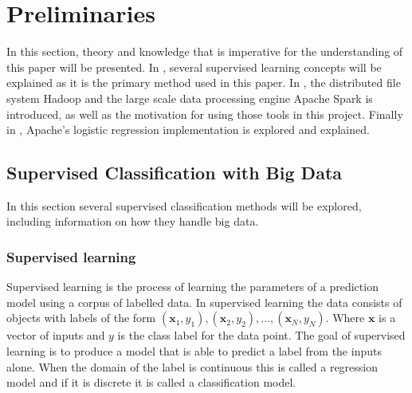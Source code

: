 \section{Preliminaries}\label{sec:prelim}
In this section, theory and knowledge that is imperative for the understanding of this paper will be presented. In , several supervised learning concepts will be explained as it is the primary method used in this paper. In , the distributed file system Hadoop and the large scale data processing engine Apache Spark is introduced, as well as the motivation for using those tools in this project. Finally in , Apache's logistic regression implementation is explored and explained. 

\subsection{Supervised Classification with Big Data}\label{sec:supervisedclassification}
In this section several supervised classification methods will be explored, including information on how they handle big data. 


\subsubsection{Supervised learning}
Supervised learning is the process of learning the parameters of a prediction model using a corpus of labelled data.
In supervised learning the data consists of objects with labels of the form 
$(\mathbf{x}_1,y_1),(\mathbf{x}_2,y_2), \dots, (\mathbf{x}_N,y_N)$.
Where $\mathbf{x}$ is a vector of inputs and $y$ is the class label for the data point.
The goal of supervised learning is to produce a model that is able to predict a label from the inputs alone.
When the domain of the label is continuous this is called a regression model and if it is discrete it is called a classification model.

